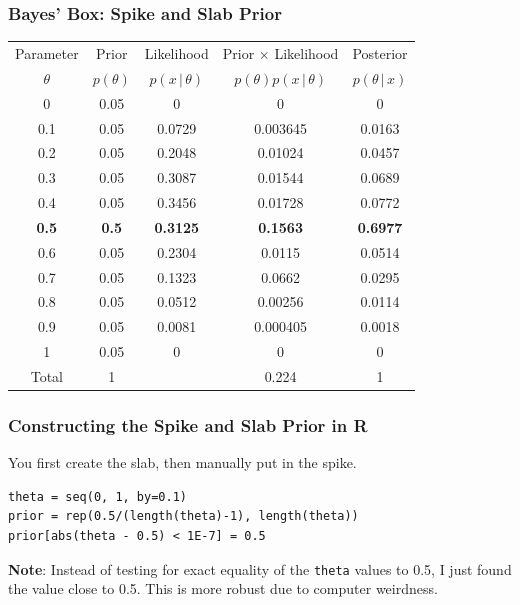 \documentclass{beamer}
\newcommand{\given}{\,|\,}
\begin{document}
\begin{frame}
\frametitle{Bayes' Box: Spike and Slab Prior}

\centering
{\footnotesize
\begin{tabular}{|c|c|c|c|c|}
\hline
Parameter & Prior & Likelihood & Prior $\times$ Likelihood & Posterior \\
$\theta$  & $p(\theta)$ & $p(x \given \theta)$ & $p(\theta)p(x\given \theta)$ & $p(\theta\given x)$ \\
\hline
0 & 0.05 & 0 & 0 & 0\\
0.1 & 0.05 & 0.0729  & 0.003645 & 0.0163\\
0.2 & 0.05 & 0.2048 & 0.01024  & 0.0457 \\
0.3 & 0.05 & 0.3087 & 0.01544 & 0.0689 \\
0.4 & 0.05 & 0.3456 & 0.01728 & 0.0772 \\
{\bf 0.5} & {\bf 0.5} & {\bf 0.3125} & {\bf 0.1563} & {\bf 0.6977} \\
0.6 & 0.05 & 0.2304 & 0.0115 & 0.0514 \\
0.7 & 0.05 & 0.1323 & 0.0662 & 0.0295 \\
0.8 & 0.05 & 0.0512 & 0.00256 & 0.0114 \\
0.9 & 0.05 & 0.0081 & 0.000405 & 0.0018 \\
1 & 0.05 & 0 & 0 & 0 \\
\hline
Total & 1 & & 0.224 & 1 \\
\hline
\end{tabular}
}

\end{frame}

\begin{frame}[fragile]
\frametitle{Constructing the Spike and Slab Prior in R}
You first create the slab, then manually put in the spike.

\begin{verbatim}
theta = seq(0, 1, by=0.1)
prior = rep(0.5/(length(theta)-1), length(theta))
prior[abs(theta - 0.5) < 1E-7] = 0.5
\end{verbatim}
\pause

{\bf Note}: Instead of testing for exact equality of the
\texttt{theta} values to 0.5, I just found the
value close to 0.5. This is more robust due to computer weirdness.
\end{frame}
\end{document}

